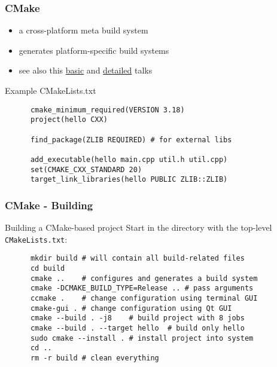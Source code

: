 \begin{frame}[fragile]
  \frametitle{CMake}
  \begin{block}{}
    \begin{itemize}
      \item a cross-platform meta build system
      \item generates platform-specific build systems
      \item see also this \href{https://www.youtube.com/watch?v=eC9-iRN2b04}{basic} and \href{https://www.youtube.com/watch?v=bsXLMQ6WgIk}{detailed} talks
    \end{itemize}
  \end{block}
  \begin{block}{Example CMakeLists.txt}
    \begin{verbatim}
      cmake_minimum_required(VERSION 3.18)
      project(hello CXX)

      find_package(ZLIB REQUIRED) # for external libs

      add_executable(hello main.cpp util.h util.cpp)
      set(CMAKE_CXX_STANDARD 20)
      target_link_libraries(hello PUBLIC ZLIB::ZLIB)
    \end{verbatim}
  \end{block}
\end{frame}

\begin{frame}[fragile]
  \frametitle{CMake - Building}
  \begin{block}{Building a CMake-based project}
    Start in the directory with the top-level \texttt{CMakeLists.txt}:
    \begin{verbatim}
      mkdir build # will contain all build-related files
      cd build
      cmake ..    # configures and generates a build system
      cmake -DCMAKE_BUILD_TYPE=Release .. # pass arguments
      ccmake .    # change configuration using terminal GUI
      cmake-gui . # change configuration using Qt GUI
      cmake --build . -j8    # build project with 8 jobs
      cmake --build . --target hello  # build only hello
      sudo cmake --install . # install project into system
      cd ..
      rm -r build # clean everything
    \end{verbatim}
  \end{block}
\end{frame}


